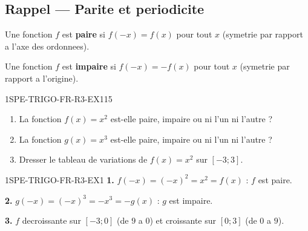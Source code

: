 

\subsection*{Rappel — Parite et periodicite}

Une fonction $f$ est \textbf{paire} si $f(-x) = f(x)$ pour tout $x$ (symetrie par rapport a l'axe des ordonnees).

Une fonction $f$ est \textbf{impaire} si $f(-x) = -f(x)$ pour tout $x$ (symetrie par rapport a l'origine).

\begin{exercice}{1SPE-TRIGO-FR-R3-EX1}{1}{5}
\begin{enumerate}
  \item La fonction $f(x) = x^2$ est-elle paire, impaire ou ni l'un ni l'autre ?
  \item La fonction $g(x) = x^3$ est-elle paire, impaire ou ni l'un ni l'autre ?
  \item Dresser le tableau de variations de $f(x) = x^2$ sur $[-3;3]$.
\end{enumerate}
\end{exercice}


\begin{corrige}{1SPE-TRIGO-FR-R3-EX1}
\textbf{1.} $f(-x) = (-x)^2 = x^2 = f(x)$ : $f$ est paire.

\textbf{2.} $g(-x) = (-x)^3 = -x^3 = -g(x)$ : $g$ est impaire.

\textbf{3.} $f$ decroissante sur $[-3;0]$ (de $9$ a $0$) et croissante sur $[0;3]$ (de $0$ a $9$).
\end{corrige}
